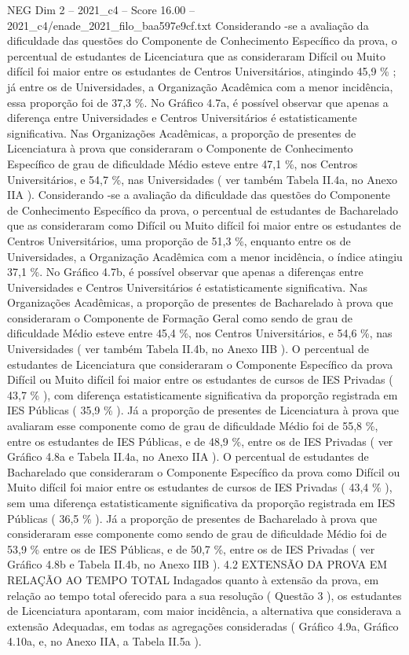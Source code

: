 \begin{textsample}{NEG Dim 2 – 2021\_c4 – Score 16.00 – 2021\_c4/enade\_2021\_filo\_baa597e9cf.txt}
Considerando -se a avaliação da dificuldade das questões do Componente de Conhecimento Específico da prova, o percentual de estudantes de Licenciatura que as consideraram Difícil ou Muito difícil foi maior entre os estudantes de Centros Universitários, atingindo 45,9 \% ; já entre os de Universidades, a Organização Acadêmica com a menor incidência, essa proporção foi de 37,3 \%.
No Gráfico 4.7a, é possível observar que apenas a diferença entre Universidades e Centros Universitários é estatisticamente significativa.
Nas Organizações Acadêmicas, a proporção de presentes de Licenciatura à prova que consideraram o Componente de Conhecimento Específico de grau de dificuldade Médio esteve entre 47,1 \%, nos Centros Universitários, e 54,7 \%, nas Universidades ( ver também Tabela II.4a, no Anexo IIA ).
Considerando -se a avaliação da dificuldade das questões do Componente de Conhecimento Específico da prova, o percentual de estudantes de Bacharelado que as consideraram como Difícil ou Muito difícil foi maior entre os estudantes de Centros Universitários, uma proporção de 51,3 \%, enquanto entre os de Universidades, a Organização Acadêmica com a menor incidência, o índice atingiu 37,1 \%.
No Gráfico 4.7b, é possível observar que apenas a diferenças entre Universidades e Centros Universitários é estatisticamente significativa.
Nas Organizações Acadêmicas, a proporção de presentes de Bacharelado à prova que consideraram o Componente de Formação Geral como sendo de grau de dificuldade Médio esteve entre 45,4 \%, nos Centros Universitários, e 54,6 \%, nas Universidades ( ver também Tabela II.4b, no Anexo IIB ).
O percentual de estudantes de Licenciatura que consideraram o Componente Específico da prova Difícil ou Muito difícil foi maior entre os estudantes de cursos de IES Privadas ( 43,7 \% ), com diferença estatisticamente significativa da proporção registrada em IES Públicas ( 35,9 \% ).
Já a proporção de presentes de Licenciatura à prova que avaliaram esse componente como de grau de dificuldade Médio foi de 55,8 \%, entre os estudantes de IES Públicas, e de 48,9 \%, entre os de IES Privadas ( ver Gráfico 4.8a e Tabela II.4a, no Anexo IIA ).
O percentual de estudantes de Bacharelado que consideraram o Componente Específico da prova como Difícil ou Muito difícil foi maior entre os estudantes de cursos de IES Privadas ( 43,4 \% ), sem uma diferença estatisticamente significativa da proporção registrada em IES Públicas ( 36,5 \% ).
Já a proporção de presentes de Bacharelado à prova que consideraram esse componente como sendo de grau de dificuldade Médio foi de 53,9 \% entre os de IES Públicas, e de 50,7 \%, entre os de IES Privadas ( ver Gráfico 4.8b e Tabela II.4b, no Anexo IIB ). 4.2 EXTENSÃO DA PROVA EM RELAÇÃO AO TEMPO TOTAL Indagados quanto à extensão da prova, em relação ao tempo total oferecido para a sua resolução ( Questão 3 ), os estudantes de Licenciatura apontaram, com maior incidência, a alternativa que considerava a extensão Adequadas, em todas as agregações consideradas ( Gráfico 4.9a, Gráfico 4.10a, e, no Anexo IIA, a Tabela II.5a ).

\end{textsample}

